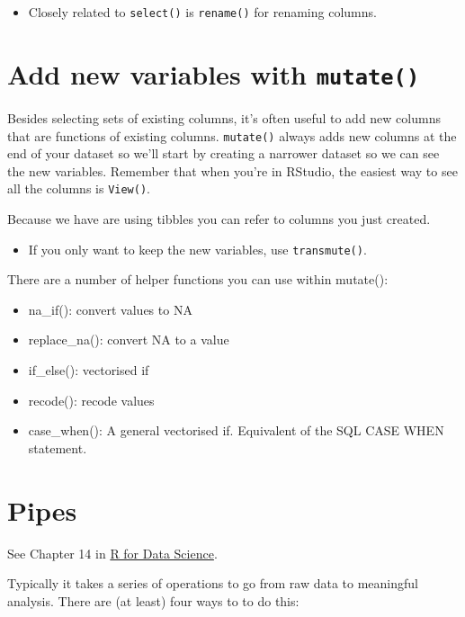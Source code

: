 \documentclass[]{book}
\providecommand{\tightlist}{%
  \setlength{\itemsep}{0pt}\setlength{\parskip}{0pt}}
\newenvironment{rmdblock}[1]
  {\begin{shaded*}
  \begin{itemize}
  \renewcommand{\labelitemi}{
    \raisebox{-.7\height}[0pt][0pt]{
      {\setkeys{Gin}{width=3em,keepaspectratio}\texttt{[image: images/\#1]}}
    }
  }
  \item
  }
  {
  \end{itemize}
  \end{shaded*}
  }
\newenvironment{rmdnote}
  {\begin{rmdblock}{note}}
  {\end{rmdblock}}
\newenvironment{rmdtip}
  {\begin{rmdblock}{tip}}
  {\end{rmdblock}}
\let\BeginKnitrBlock\begin \let\EndKnitrBlock\end
\begin{document}
\begin{rmdnote}
Closely related to \texttt{select()} is \texttt{rename()} for renaming
columns.
\end{rmdnote}

\section{\texorpdfstring{Add new variables with
\texttt{mutate()}}{Add new variables with mutate()}}\label{add-new-variables-with-mutate}

Besides selecting sets of existing columns, it's often useful to add new
columns that are functions of existing columns. \texttt{mutate()} always
adds new columns at the end of your dataset so we'll start by creating a
narrower dataset so we can see the new variables. Remember that when
you're in RStudio, the easiest way to see all the columns is
\texttt{View()}.

Because we have are using tibbles you can refer to columns you just
created.

\begin{rmdtip}
If you only want to keep the new variables, use \texttt{transmute()}.
\end{rmdtip}

There are a number of helper functions you can use within mutate():

\begin{itemize}
\tightlist
\item
  na\_if(): convert values to NA
\item
  replace\_na(): convert NA to a value
\item
  if\_else(): vectorised if
\item
  recode(): recode values
\item
  case\_when(): A general vectorised if. Equivalent of the SQL CASE WHEN
  statement.
\end{itemize}

\section{Pipes}\label{pipes}

\BeginKnitrBlock{rmdimportant}
See Chapter 14 in \href{http://r4ds.had.co.nz/pipes.html}{R for Data
Science}.
\EndKnitrBlock{rmdimportant}

Typically it takes a series of operations to go from raw data to
meaningful analysis. There are (at least) four ways to to do this:
\end{document}
